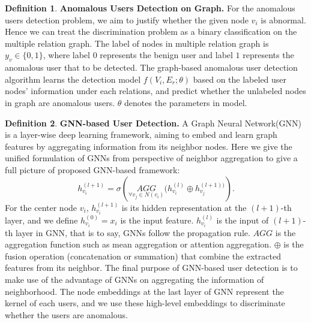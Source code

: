 \documentclass[conference]{IEEEtran}
\theoremstyle{definition}
\newtheorem{definition}{Definition}%
\begin{document}
\begin{definition}\textbf{Anomalous Users Detection on Graph.}
For the anomalous users detection problem, we aim to justify whether the given node $v_i$ is abnormal. Hence we can treat the discrimination problem as a binary classification on the multiple relation graph. The label of nodes in multiple relation graph is $y_v \in \{0, 1\}$, where label $0$ represents the benign user and label $1$ represents the anomalous user that to be detected. The graph-based anomalous user detection algorithm learns the detection model $f({V}_i, {E}_r; \theta)$ based on the labeled user nodes' information under each relations, and predict whether the unlabeled nodes in graph are anomalous users. $\theta$ denotes the parameters in model. 

\end{definition}

\begin{definition}\textbf{GNN-based User Detection.}
A Graph Neural Network(GNN) is a layer-wise deep learning framework, aiming to embed and learn graph features by aggregating information from its neighbor nodes. Here we give the unified formulation of GNNs from perspective of neighbor aggregation to give a full picture of proposed GNN-based framework:
\begin{equation}
    h^{(l+1)}_{v_i} = \sigma\left(\underset{\forall v_j \in N(v_i)}{AGG} (h^{(l)}_{v_i}\oplus h^{(l+1))}_{v_j}   \right).
\end{equation}
For the center node $v_i$, $h^{(l+1)}_{v_i}$ is its hidden representation at the $(l+1)$-th layer, and we define $h^{(0)}_{v_i} = x_i$ is the input feature. $h^{(l)}_{v_i}$ is the input of $(l+1)$-th layer in GNN, that is to say, GNNs follow the propagation rule. $AGG$ is the aggregation function such as mean aggregation or attention aggregation. $\oplus$ is the fusion operation (concatenation or summation) that combine the extracted features from its neighbor. The final purpose of GNN-based user detection is to make use of the advantage of GNNs on aggregating the information of neighborhood. The node embeddings at the last layer of GNN represent the kernel of each users, and we use these high-level embeddings to discriminate whether the users are anomalous.
\end{definition}
\end{document}

